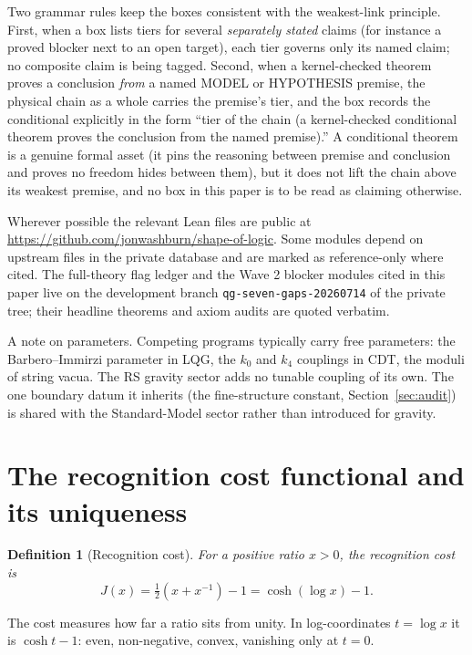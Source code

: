 \documentclass[11pt,letterpaper]{article}
\newtheorem{definition}[theorem]{Definition}
\begin{document}
Two grammar rules keep the boxes consistent with the weakest-link principle. First, when a box lists tiers for several \emph{separately stated} claims (for instance a proved blocker next to an open target), each tier governs only its named claim; no composite claim is being tagged. Second, when a kernel-checked theorem proves a conclusion \emph{from} a named MODEL or HYPOTHESIS premise, the physical chain as a whole carries the premise's tier, and the box records the conditional explicitly in the form ``tier of the chain (a kernel-checked conditional theorem proves the conclusion from the named premise).'' A conditional theorem is a genuine formal asset (it pins the reasoning between premise and conclusion and proves no freedom hides between them), but it does not lift the chain above its weakest premise, and no box in this paper is to be read as claiming otherwise.

Wherever possible the relevant Lean files are public at \url{https://github.com/jonwashburn/shape-of-logic}. Some modules depend on upstream files in the private database and are marked as reference-only where cited. The full-theory flag ledger and the Wave 2 blocker modules cited in this paper live on the development branch \texttt{qg-seven-gaps-20260714} of the private tree; their headline theorems and axiom audits are quoted verbatim.

A note on parameters. Competing programs typically carry free parameters: the Barbero--Immirzi parameter in LQG, the $k_0$ and $k_4$ couplings in CDT, the moduli of string vacua. The RS gravity sector adds no tunable coupling of its own. The one boundary datum it inherits (the fine-structure constant, Section~\ref{sec:audit}) is shared with the Standard-Model sector rather than introduced for gravity.

\section{The recognition cost functional and its uniqueness}
\label{sec:cost}

\begin{definition}[Recognition cost]
For a positive ratio $x>0$, the recognition cost is
\begin{equation}
J(x)=\tfrac{1}{2}\left(x+x^{-1}\right)-1=\cosh(\log x)-1.
\label{eq:jcost}
\end{equation}
\end{definition}

The cost measures how far a ratio sits from unity. In log-coordinates $t=\log x$ it is $\cosh t-1$: even, non-negative, convex, vanishing only at $t=0$.
\end{document}
